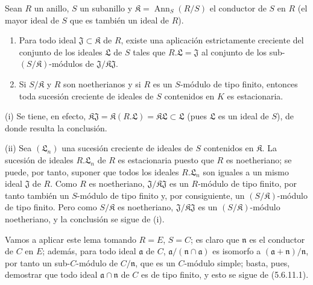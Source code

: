 \begin{lemma}[5.6.11.1]
Sean $R$ un anillo, $S$ un subanillo y
$\mathfrak K=\operatorname{Ann}_S(R/S)$ el conductor de $S$ en $R$
(el mayor ideal de $S$ que es también un ideal de $R$).
\begin{enumerate}
\item[\textup{(i)}] Para todo ideal $\mathfrak J\subset\mathfrak K$ de $R$, existe una
aplicación estrictamente creciente del conjunto de los ideales $\mathfrak L$
de $S$ tales que $R.\mathfrak L=\mathfrak J$ al conjunto de los
sub-$(S/\mathfrak K)$-módulos de
$\mathfrak J/\mathfrak K\mathfrak J$.
\item[\textup{(ii)}] Si $S/\mathfrak K$ y $R$ son noetherianos y si $R$ es un
$S$-módulo de tipo finito, entonces toda sucesión creciente de ideales de $S$
contenidos en $K$ es estacionaria.
\end{enumerate}
\end{lemma}

(i) Se tiene, en efecto,
$\mathfrak K\mathfrak J=\mathfrak K(R.\mathfrak L)
=\mathfrak K\mathfrak L\subset\mathfrak L$
(pues $\mathfrak L$ es un ideal de $S$), de donde resulta la conclusión.

(ii) Sea $(\mathfrak L_n)$ una sucesión creciente de ideales de $S$ contenidos
en $\mathfrak K$. La sucesión de ideales $R.\mathfrak L_n$ de $R$ es
estacionaria puesto que $R$ es noetheriano; se puede, por tanto, suponer que
todos los ideales $R.\mathfrak L_n$ son iguales a un mismo ideal $\mathfrak J$
de $R$. Como $R$ es noetheriano, $\mathfrak J/\mathfrak K\mathfrak J$ es un
$R$-módulo de tipo finito, por tanto también un $S$-módulo de tipo finito y,
por consiguiente, un $(S/\mathfrak K)$-módulo de tipo finito. Pero como
$S/\mathfrak K$ es noetheriano, $\mathfrak J/\mathfrak K\mathfrak J$ es un
$(S/\mathfrak K)$-módulo noetheriano, y la conclusión se sigue de (i).

Vamos a aplicar este lema tomando $R=E$, $S=C$; es claro que $\mathfrak n$ es
el conductor de $C$ en $E$; además, para todo ideal $\mathfrak a$ de $C$,
$\mathfrak a/(\mathfrak n\cap\mathfrak a)$ es isomorfo a
$(\mathfrak a+\mathfrak n)/\mathfrak n$, por tanto un sub-$C$-módulo de
$C/\mathfrak n$, que es un $C$-módulo simple; basta, pues, demostrar que todo
ideal $\mathfrak a\cap\mathfrak n$ de $C$ es de tipo finito, y esto se sigue
de (5.6.11.1).

